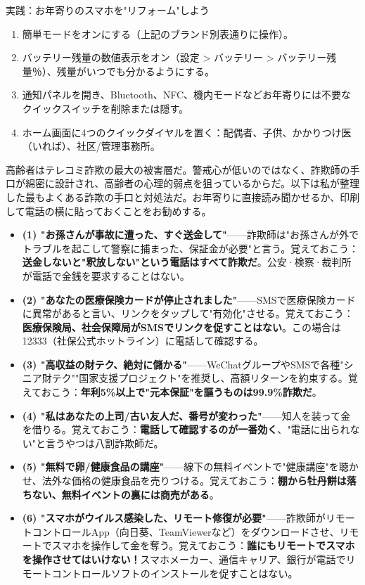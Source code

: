 \begin{tcbpractice}{実践：お年寄りのスマホを"リフォーム"しよう}
\begin{enumerate}
  \item 簡単モードをオンにする（上記のブランド別表通りに操作）。
  \item バッテリー残量の数値表示をオン（設定 > バッテリー > バッテリー残量％）、残量がいつでも分かるようにする。
  \item 通知パネルを開き、Bluetooth、NFC、機内モードなどお年寄りには不要なクイックスイッチを削除または隠す。
  \item ホーム画面に4つのクイックダイヤルを置く：配偶者、子供、かかりつけ医（いれば）、社区/管理事務所。
\end{enumerate}

\end{tcbpractice}


高齢者はテレコミ詐欺の最大の被害層だ。警戒心が低いのではなく、詐欺師の手口が綿密に設計され、高齢者の心理的弱点を狙っているからだ。以下は私が整理した最もよくある詐欺の手口と対処法だ。お年寄りに直接読み聞かせるか、印刷して電話の横に貼っておくことをお勧めする。


\begin{itemize}
  \item \textbf{(1) "お孫さんが事故に遭った、すぐ送金して"}——詐欺師は"お孫さんが外でトラブルを起こして警察に捕まった、保証金が必要"と言う。覚えておこう：\textbf{送金しないと"釈放しない"という電話はすべて詐欺だ}。公安·検察·裁判所が電話で金銭を要求することはない。
  \item \textbf{(2) "あなたの医療保険カードが停止されました"}——SMSで医療保険カードに異常があると言い、リンクをタップして"有効化"させる。覚えておこう：\textbf{医療保険局、社会保障局がSMSでリンクを促すことはない}。この場合は12333（社保公式ホットライン）に電話して確認する。
  \item \textbf{(3) "高収益の財テク、絶対に儲かる"}——WeChatグループやSMSで各種"シニア財テク""国家支援プロジェクト"を推奨し、高額リターンを約束する。覚えておこう：\textbf{年利5\%以上で"元本保証"を謳うものは99.9\%詐欺だ}。
  \item \textbf{(4) "私はあなたの上司/古い友人だ、番号が変わった"}——知人を装って金を借りる。覚えておこう：\textbf{電話して確認するのが一番効く}、"電話に出られない"と言うやつは八割詐欺師だ。
  \item \textbf{(5) "無料で卵/健康食品の講座"}——線下の無料イベントで"健康講座"を聴かせ、法外な価格の健康食品を売りつける。覚えておこう：\textbf{棚から牡丹餅は落ちない、無料イベントの裏には商売がある}。
  \item \textbf{(6) "スマホがウイルス感染した、リモート修復が必要"}——詐欺師がリモートコントロールApp（向日葵、TeamViewerなど）をダウンロードさせ、リモートでスマホを操作して金を奪う。覚えておこう：\textbf{誰にもリモートでスマホを操作させてはいけない！}スマホメーカー、通信キャリア、銀行が電話でリモートコントロールソフトのインストールを促すことはない。
\end{itemize}

